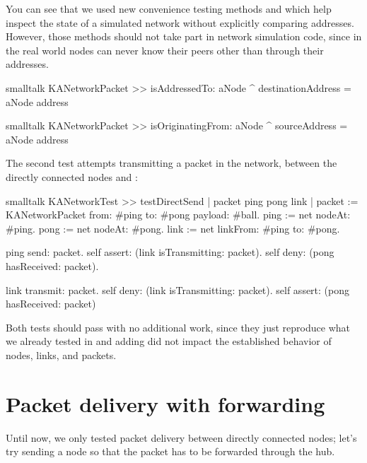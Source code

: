 \documentclass[10pt,twoside,english]{_support/latex/sbabook/sbabook}
\begin{document}
You can see that we used new convenience testing methods  and  which help inspect the state of a simulated network without explicitly comparing addresses.
However, those methods should not take part in network simulation code, since in the real world nodes can never know their peers other than through their addresses.

\begin{displaycode}{smalltalk}
KANetworkPacket >> isAddressedTo: aNode
    ^ destinationAddress = aNode address
\end{displaycode}

\begin{displaycode}{smalltalk}
KANetworkPacket >> isOriginatingFrom: aNode
    ^ sourceAddress = aNode address
\end{displaycode}

The second test attempts transmitting a packet in the network, between the directly connected nodes  and :

\begin{displaycode}{smalltalk}
KANetworkTest >> testDirectSend
    | packet ping pong link |
    packet := KANetworkPacket from: #ping to: #pong payload: #ball.
    ping := net nodeAt: #ping.
    pong := net nodeAt: #pong.
    link := net linkFrom: #ping to: #pong.

    ping send: packet.
    self assert: (link isTransmitting: packet).
    self deny: (pong hasReceived: packet).

    link transmit: packet.
    self deny: (link isTransmitting: packet).
    self assert: (pong hasReceived: packet)
\end{displaycode}

Both tests should pass with no additional work, since they just reproduce what we already tested in  and adding  did not impact the established behavior of nodes, links, and packets.
\section{Packet delivery with forwarding}
Until now, we only tested packet delivery between directly connected nodes; let's try sending a node so that the packet has to be forwarded through the hub.
\end{document}
